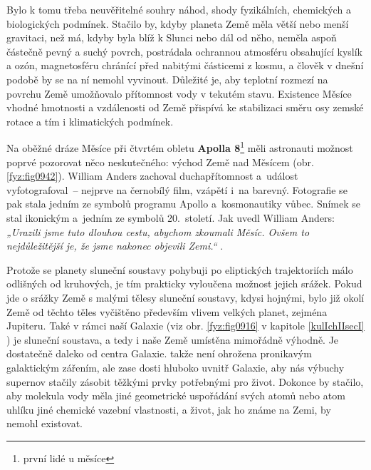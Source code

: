       Bylo k tomu třeba neuvěřitelné souhry náhod, shody fyzikálních, chemických a biologických
      podmínek. Stačilo by, kdyby planeta Země měla větší nebo menší gravitaci, než má, kdyby byla
      blíž k Slunci nebo dál od něho, neměla aspoň částečně pevný a suchý povrch, postrádala
      ochrannou atmosféru obsahující kyslík a ozón, magnetosféru chránící před nabitými částicemi z
      kosmu, a člověk v dnešní podobě by se na ní nemohl vyvinout. Důležité je, aby teplotní rozmezí
      na povrchu Země umožňovalo přítomnost vody v tekutém stavu. Existence Měsíce vhodné hmotnosti
      a vzdálenosti od Země přispívá ke stabilizaci směru osy zemské rotace a tím i klimatických
      podmínek.


      Na oběžné dráze Měsíce při čtvrtém obletu \textbf{Apolla 8}\footnote{první lidé u měsíce} měli
      astronauti možnost poprvé pozorovat něco neskutečného: východ Země nad Měsícem (obr.
      \ref{fyz:fig0942}). William Anders zachoval duchapřítomnost a událost vyfotografoval – nejprve
      na černobílý film, vzápětí i na barevný. Fotografie se pak stala jedním ze symbolů programu
      Apollo a kosmonautiky vůbec. Snímek se stal ikonickým a jedním ze symbolů 20. století. Jak
      uvedl William Anders: \emph{„Urazili jsme tuto dlouhou cestu, abychom zkoumali Měsíc. Ovšem to
      nejdůležitější je, že jsme nakonec objevili Zemi.“} \cite[s.~69]{Prikryl2019}.

      Protože se planety sluneční soustavy pohybuji po eliptických trajektoriích málo odlišných od
      kruhových, je tím prakticky vyloučena možnost jejich srážek. Pokud jde o srážky Země s malými
      tělesy sluneční soustavy, kdysi hojnými, bylo již okolí Země od těchto těles vyčištěno
      především vlivem velkých planet, zejména Jupiteru. Také v rámci naší Galaxie (viz obr.
      \ref{fyz:fig0916} v kapitole \ref{kulIchIIsecI} ) je sluneční soustava, a
      tedy i naše Země umístěna mimořádně výhodně. Je dostatečně daleko od centra Galaxie. takže
      není ohrožena pronikavým galaktickým zářením, ale zase dosti hluboko uvnitř Galaxie, aby nás
      výbuchy supernov stačily zásobit těžkými prvky potřebnými pro život. Dokonce by stačilo, aby
      molekula vody měla jiné geometrické uspořádání svých atomů nebo atom uhlíku jiné chemické
      vazební vlastnosti, a život, jak ho známe na Zemi, by nemohl existovat.

